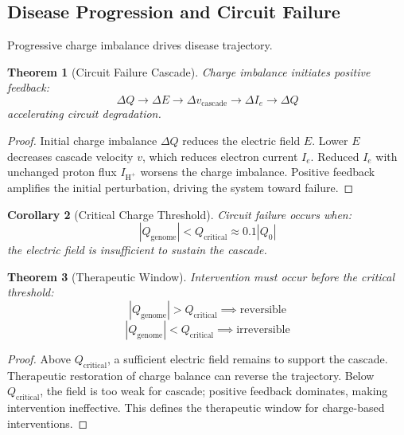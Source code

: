\documentclass[11pt,twocolumn,a4paper]{article}
\newtheorem{theorem}{Theorem}[section]
\newtheorem{corollary}[theorem]{Corollary}
\theoremstyle{definition}
\theoremstyle{remark}
\begin{document}
\subsection{Disease Progression and Circuit Failure}

Progressive charge imbalance drives disease trajectory.

\begin{theorem}[Circuit Failure Cascade]
\label{thm:circuit_failure}
Charge imbalance initiates positive feedback:
\begin{equation}
\Delta Q \to \Delta E \to \Delta v_{\text{cascade}} \to \Delta I_e \to \Delta Q
\end{equation}
accelerating circuit degradation.
\end{theorem}

\begin{proof}
Initial charge imbalance $\Delta Q$ reduces the electric field $E$. Lower $E$ decreases cascade velocity $v$, which reduces electron current $I_e$. Reduced $I_e$ with unchanged proton flux $I_{\text{H}^+}$ worsens the charge imbalance. Positive feedback amplifies the initial perturbation, driving the system toward failure.
\end{proof}

\begin{corollary}[Critical Charge Threshold]
\label{cor:critical_threshold}
Circuit failure occurs when:
\begin{equation}
|Q_{\text{genome}}| < Q_{\text{critical}} \approx 0.1 |Q_0|
\end{equation}
 the electric field is insufficient to sustain the cascade.
\end{corollary}

\begin{theorem}[Therapeutic Window]
\label{thm:therapeutic_window}
Intervention must occur before the critical threshold:
\begin{equation}
|Q_{\text{genome}}| > Q_{\text{critical}} \implies \text{reversible}
\end{equation}
\begin{equation}
|Q_{\text{genome}}| < Q_{\text{critical}} \implies \text{irreversible}
\end{equation}
\end{theorem}

\begin{proof}
Above $Q_{\text{critical}}$, a sufficient electric field remains to support the cascade. Therapeutic restoration of charge balance can reverse the trajectory. Below $Q_{\text{critical}}$, the field is too weak for cascade; positive feedback dominates, making intervention ineffective. This defines the therapeutic window for charge-based interventions.
\end{proof}
\end{document}
